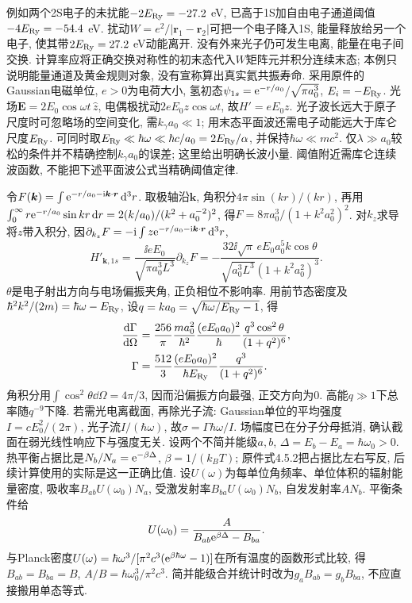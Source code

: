 例如两个2S电子的未扰能$-2E_{\rm Ry}=-27.2$ eV, 已高于1S加自由电子通道阈值$-4E_{\rm Ry}=-54.4$ eV. 扰动$W=e^2/|\boldsymbol r_1-\boldsymbol r_2|$可把一个电子降入1S, 能量释放给另一个电子, 使其带$2E_{\rm Ry}=27.2$ eV动能离开. 没有外来光子仍可发生电离, 能量在电子间交换. 计算率应将正确交换对称性的初末态代入$W$矩阵元并积分连续末态; 本例只说明能量通道及黄金规则对象, 没有宣称算出真实氦共振寿命.
采用原件的Gaussian电磁单位, $e>0$为电荷大小, 氢初态$\psi_{1s}=\mathrm e^{-r/a_0}/\sqrt{\pi a_0^3}$, $E_i=-E_{\rm Ry}$. 光场$\boldsymbol E=2E_0\cos\omega t\,\hat z$, 电偶极扰动$2eE_0z\cos\omega t$, 故$H'=eE_0z$. 光子波长远大于原子尺度时可忽略场的空间变化, 需$k_\gamma a_0\ll1$; 用末态平面波还需电子动能远大于库仑尺度$E_{\rm Ry}$. 可同时取$E_{\rm Ry}\ll\hbar\omega\ll\hbar c/a_0=2E_{\rm Ry}/\alpha$, 并保持$\hbar\omega\ll mc^2$. 仅$\lambda\gg a_0$较松的条件并不精确控制$k_\gamma a_0$的误差; 这里给出明确长波小量. 阈值附近需库仑连续波函数, 不能把下述平面波公式当精确阈值定律.

令$F(\boldsymbol k)=\int\mathrm e^{-r/a_0-\mathrm i\boldsymbol k\cdot\boldsymbol r}\,\mathrm d^3r$. 取极轴沿$\boldsymbol k$, 角积分$4\pi\sin(kr)/(kr)$, 再用$\int_0^\infty r\mathrm e^{-r/a_0}\sin kr\,\mathrm d r=2(k/a_0)/(k^2+a_0^{-2})^2$, 得$F=8\pi a_0^3/(1+k^2a_0^2)^2$. 对$k_z$求导将$z$带入积分, 因$\partial_{k_z}F=-\mathrm i\int z\mathrm e^{-r/a_0-\mathrm i\boldsymbol k\cdot\boldsymbol r}\,\mathrm d^3r$,
\[
H'_{\boldsymbol k,1s}=\frac{\ii eE_0}{\sqrt{\pi a_0^3L^3}}\partial_{k_z}F
=-\frac{32\ii\sqrt\pi\,eE_0a_0^5k\cos\theta}
{\sqrt{a_0^3L^3}(1+k^2a_0^2)^3}.
\]
$\theta$是电子射出方向与电场偏振夹角, 正负相位不影响率. 用前节态密度及$\hbar^2k^2/(2m)=\hbar\omega-E_{\rm Ry}$, 设$q=ka_0=\sqrt{\hbar\omega/E_{\rm Ry}-1}$, 得
\begin{align*}
\frac{\mathrm d\Gamma}{\mathrm d\Omega}
&=\frac{256}{\pi}\frac{ma_0^2}{\hbar^2}\frac{(eE_0a_0)^2}{\hbar}
\frac{q^3\cos^2\theta}{(1+q^2)^6},\\
\Gamma&=\frac{512}{3}\frac{(eE_0a_0)^2}{\hbar E_{\rm Ry}}
\frac{q^3}{(1+q^2)^6}.
\end{align*}
角积分用$\int\cos^2\theta\dd\Omega=4\pi/3$, 因而沿偏振方向最强, 正交方向为0. 高能$q\gg1$下总率随$q^{-9}$下降. 若需光电离截面, 再除光子流: Gaussian单位的平均强度$I=cE_0^2/(2\pi)$, 光子流$I/(\hbar\omega)$, 故$\sigma=\Gamma\hbar\omega/I$. 场幅度已在分子分母抵消, 确认截面在弱光线性响应下与强度无关.
设两个不简并能级$a,b$, $\Delta=E_b-E_a=\hbar\omega_0>0$. 热平衡占据比是$N_b/N_a=\mathrm e^{-\beta\Delta}$, $\beta=1/(k_BT)$; 原件式4.5.2把占据比左右写反, 后续计算使用的实际是这一正确比值. 设$U(\omega)$为每单位角频率、单位体积的辐射能量密度, 吸收率$B_{ab}U(\omega_0)N_a$, 受激发射率$B_{ba}U(\omega_0)N_b$, 自发发射率$AN_b$. 平衡条件给
\[
U(\omega_0)=\frac{A}{B_{ab}\mathrm e^{\beta\Delta}-B_{ba}}.
\]
与Planck密度$U(\omega)=\hbar\omega^3/[\pi^2c^3(\mathrm e^{\beta\hbar\omega}-1)]$在所有温度的函数形式比较, 得$B_{ab}=B_{ba}=B$, $A/B=\hbar\omega_0^3/\pi^2c^3$. 简并能级合并统计时改为$g_aB_{ab}=g_bB_{ba}$, 不应直接搬用单态等式.

